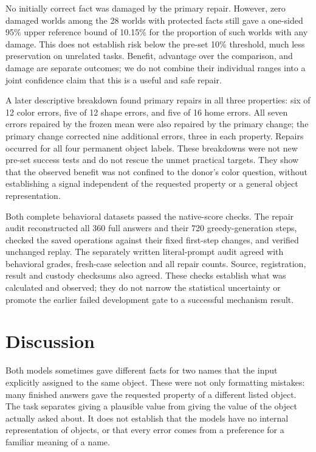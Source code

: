\documentclass[10pt,letterpaper]{article}
\begin{document}
No initially correct fact was damaged by the primary repair. However, zero damaged worlds among the 28 worlds with protected facts still gave a one-sided 95\% upper reference bound of 10.15\% for the proportion of such worlds with any damage. This does not establish risk below the pre-set 10\% threshold, much less preservation on unrelated tasks. Benefit, advantage over the comparison, and damage are separate outcomes; we do not combine their individual ranges into a joint confidence claim that this is a useful and safe repair.


A later descriptive breakdown found primary repairs in all three properties: six of 12 color errors, five of 12 shape errors, and five of 16 home errors. All seven errors repaired by the frozen mean were also repaired by the primary change; the primary change corrected nine additional errors, three in each property. Repairs occurred for all four permanent object labels. These breakdowns were not new pre-set success tests and do not rescue the unmet practical targets. They show that the observed benefit was not confined to the donor's color question, without establishing a signal independent of the requested property or a general object representation.


Both complete behavioral datasets passed the native-score checks. The repair audit reconstructed all 360 full answers and their 720 greedy-generation steps, checked the saved operations against their fixed first-step changes, and verified unchanged replay. The separately written literal-prompt audit agreed with behavioral grades, fresh-case selection and all repair counts. Source, registration, result and custody checksums also agreed. These checks establish what was calculated and observed; they do not narrow the statistical uncertainty or promote the earlier failed development gate to a successful mechanism result.


\section*{Discussion}

Both models sometimes gave different facts for two names that the input explicitly assigned to the same object. These were not only formatting mistakes: many finished answers gave the requested property of a different listed object. The task separates giving a plausible value from giving the value of the object actually asked about. It does not establish that the models have no internal representation of objects, or that every error comes from a preference for a familiar meaning of a name.
\end{document}
